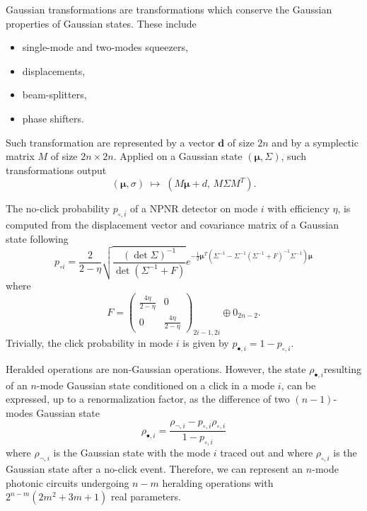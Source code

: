 Gaussian transformations are transformations which conserve the Gaussian properties of Gaussian states. 
These include
\begin{itemize}
	\item single-mode and two-modes squeezers,
	\item displacements,
	\item beam-splitters,
	\item phase shifters.
\end{itemize}
Such transformation are represented by a vector $\mathbf{d}$ of size $2n$ and by a symplectic matrix $M$ of size $2n\times2n$.
Applied on a Gaussian state $(\mathbf{\mu},\Sigma)$, such transformations output
\begin{equation}
	(\mathbf{\mu},\sigma)\; \mapsto\; (M\mathbf{\mu} + d,\, M\Sigma M^T).
\end{equation}

The no-click probability $p_{\circ,i}$ of a NPNR detector on mode $i$ with efficiency $\eta$, is computed from the displacement vector and covariance matrix of a Gaussian state following
\begin{equation}
p_{\circ i} =\frac{2}{2-\eta}\sqrt{\frac{(\det \Sigma)^{-1}}{ \det(\Sigma^{-1}+F)}}
e^{-\frac{1}{2}{\mathbf{\mu} }^T\left( \Sigma^{-1} - \Sigma^{-1} (\Sigma^{-1}+F)^{-1} \Sigma^{-1} \right){\mathbf{\mu} }}
\end{equation}
where
\begin{equation}
F= \left(\begin{array}{cc}
    \frac{4\eta}{2-\eta} & 0 \\
    0 & \frac{4\eta}{2-\eta}
    \end{array}\right)_{2i-1,2i} \oplus 0_{2n-2}.
\end{equation}
Trivially, the click probability in mode $i$ is given by $p_{\bullet,i}=1-p_{\circ,i}$.

Heralded operations are non-Gaussian operations.
However, the state $\rho_{\bullet,i}$resulting of an $n$-mode Gaussian state conditioned on a click in a mode $i$, can be expressed, up to a renormalization factor, as the difference of two $(n-1)$-modes Gaussian state
\begin{equation}
    \rho_{\bullet,i} = \frac{\rho_{\lnot,i} - p_{\circ,i} \rho_{\circ,i}}{1 - p_{\circ,i}}
\end{equation}
where $\rho_{\lnot,i}$ is the Gaussian state with the mode $i$ traced out and where $\rho_{\circ,i}$ is the Gaussian state after a no-click event.
Therefore, we can represent an $n$-mode photonic circuits undergoing $n-m$ heralding operations with $2^{n-m}(2m^2+3m+1)$ real parameters.

